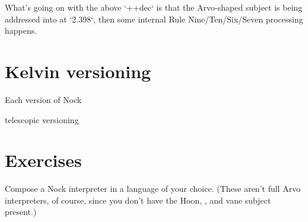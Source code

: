What's going on with the above `++dec` is that the Arvo-shaped subject is being addressed into at `2.398`, then some internal Rule Nine/Ten/Six/Seven processing happens.

\section{Kelvin versioning}

Each version of Nock

telescopic versioning

\section{Exercises}

Compose a Nock interpreter in a language of your choice.  (These aren't full Arvo interpreters, of course, since you don't have the Hoon, \zuse, and vane subject present.)
